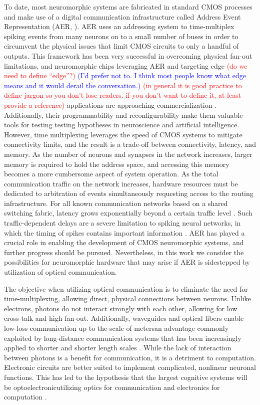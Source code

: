 \documentclass[twocolumn]{article}
\begin{document}
To date, most neuromorphic systems are fabricated in standard CMOS processes and make use of a digital communication infrastructure called Address Event Representation (AER, \cite{bo2000,payu2017, young2019review}). AER uses an addressing system to time-multiplex spiking events from many neurons on to a small number of buses in order to circumvent the physical issues that limit CMOS circuits to only a handful of outputs. This framework has been very successful in overcoming physical fan-out limitations, and neuromorphic chips leveraging AER and targeting edge \textcolor{red}{(do we need to define ``edge''?)} \textcolor{blue}{(I'd prefer not to. I think most people know what edge means and it would derail the conversation.)} \textcolor{red}{(in general it is good practice to define jargon so you don't lose readers. if you don't want to define it, at least provide a reference)} applications are approaching commercialization \cite{merolla2014million, davies2018loihi}. Additionally, their programmability and reconfigurability make them valuable tools for testing testing hypotheses in neuroscience and artificial intelligence. However, time multiplexing leverages the speed of CMOS systems to mitigate connectivity limits, and the result is a trade-off between connectivity, latency, and memory. As the number of neurons and synapses in the network increases, larger memory is required to hold the address space, and accessing this memory becomes a more cumbersome aspect of system operation. As the total communication traffic on the network increases, hardware resources must be dedicated to arbitration of events simultaneously requesting access to the routing infrastructure. For all known communication networks based on a shared switching fabric, latency grows exponentially beyond a certain traffic level \cite{hepa2011}. Such traffic-dependent delays are a severe limitation to spiking neural networks, in which the timing of spikes contains important information \cite{panzeri2001role}. AER has played a crucial role in enabling the development of CMOS neuromorphic systems, and further progress should be pursued. Nevertheless, in this work we consider the possibilities for neuromorphic hardware that may arise if AER is sidestepped by utilization of optical communication.

The objective when utilizing optical communication is to eliminate the need for time-multiplexing, allowing direct, physical connections between neurons. Unlike electrons, photons do not interact strongly with each other, allowing for low cross-talk and high fan-out. Additionally, waveguides and optical fibers enable low-loss communication up to the scale of meters\textemdash an advantage commonly exploited by long-distance communication systems that has been increasingly applied to shorter and shorter length scales \cite{miller2017attojoule}. While the lack of interaction between photons is a benefit for communication, it is a detriment to computation. Electronic circuits are better suited to implement complicated, nonlinear neuronal functions. This has led to the hypothesis that the largest cognitive systems will be optoelectronic\textemdash utilizing optics for communication and electronics for computation \cite{shainline2019superconducting}. 
\end{document}
